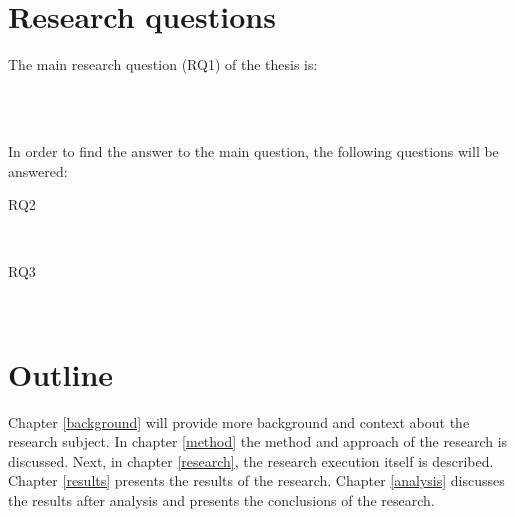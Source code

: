 \section{Research questions}
\label{questions}

The main research question (RQ1) of the thesis is:
\begin{description}
	\item \hfill \\ \emph{\researchQuestion}
\end{description}

\noindent\\
In order to find the answer to the main question, the following questions will
be answered:
\begin{description}
	\item[RQ2] \hfill \\ \emph{\subQuestionOne}
	\item[RQ3] \hfill \\ \emph{\subQuestionTwo}
\end{description}

\section{Outline}

Chapter \ref{background} will provide more background and context about the
research subject. In chapter \ref{method} the method and approach of the
research is discussed. Next, in chapter \ref{research}, the research execution
itself is described. Chapter \ref{results} presents the results of the research.
Chapter \ref{analysis} discusses the results after analysis and presents the
conclusions of the research.

